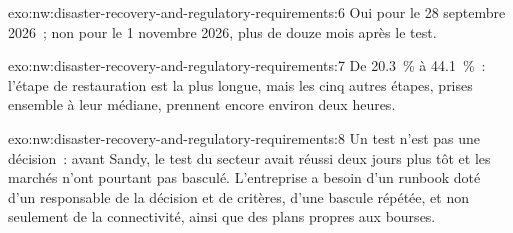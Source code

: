 \begin{solution}{exo:nw:disaster-recovery-and-regulatory-requirements:6}
Oui pour le 28 septembre 2026~; non pour le 1 novembre 2026, plus de douze mois après le test.
\end{solution}

\begin{solution}{exo:nw:disaster-recovery-and-regulatory-requirements:7}
De 20.3~\% à 44.1~\%~: l'étape de restauration est la plus longue, mais les cinq autres étapes, prises ensemble à leur médiane, prennent encore environ deux heures.
\end{solution}

\begin{solution}{exo:nw:disaster-recovery-and-regulatory-requirements:8}
Un test n'est pas une décision~: avant Sandy, le test du secteur avait réussi deux jours plus tôt et les marchés n'ont pourtant pas basculé.
L'entreprise a besoin d'un runbook doté d'un responsable de la décision et de critères, d'une bascule répétée, et non seulement de la connectivité, ainsi que des plans propres aux bourses.
\end{solution}

